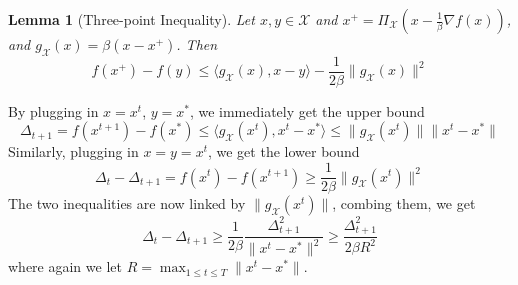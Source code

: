 \documentclass{scrartcl}
\newtheorem{lemma}{Lemma}
\newcommand{\sX}{\mathcal{X}}
\begin{document}
\begin{lemma}[Three-point Inequality]
Let $x,y\in\sX$ and $x^+=\Pi_\sX\left(x-\frac{1}{\beta}\nabla f(x)\right)$, and $g_\sX(x)=\beta
(x-x^+)$. Then
\begin{equation}
  f(x^+)-f(y) \leq \langle g_\sX(x), x-y\rangle - \frac{1}{2\beta}\|g_\sX(x)\|^2
\end{equation}
\end{lemma}

By plugging in $x=x^t$, $y=x^*$, we immediately get the upper bound
\begin{equation}
  \Delta_{t+1} = f(x^{t+1})-f(x^*) \leq \langle g_\sX(x^t),x^t-x^*\rangle
  \leq \|g_\sX(x^t)\|\|x^t-x^*\|
\end{equation}
Similarly, plugging in $x=y=x^t$, we get the lower bound
\begin{equation}
\Delta_t - \Delta_{t+1} = f(x^t)-f(x^{t+1}) \geq \frac{1}{2\beta}\|g_\sX(x^t)\|^2
\end{equation}
The two inequalities are now linked by $\|g_\sX(x^t)\|$, combing them, we get
\[
  \Delta_t - \Delta_{t+1} \geq \frac{1}{2\beta} \frac{\Delta_{t+1}^2}{\|x^t-x^*\|^2}
  \geq \frac{\Delta_{t+1}^2}{2\beta R^2}
\]
where again we let $R=\max_{1\leq t\leq T}\|x^t-x^*\|$.


%
%
\end{document}
